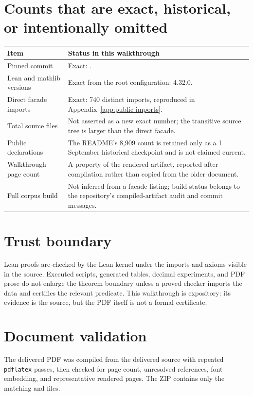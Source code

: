 \documentclass[11pt,oneside]{report}
\theoremstyle{definition}
\theoremstyle{remark}
\DeclareRobustCommand{\lean}[1]{\texorpdfstring{\texttt{\expandafter\seqsplit\expandafter{\detokenize{#1}}}}{\detokenize{#1}}}
\DeclareRobustCommand{\file}[1]{\texorpdfstring{\texttt{\expandafter\seqsplit\expandafter{\detokenize{#1}}}}{\detokenize{#1}}}
\begin{document}
\section{Counts that are exact, historical, or intentionally omitted}
\begin{longtable}{@{}>{\raggedright\arraybackslash}p{} >{\raggedright\arraybackslash}p{}@{}}
\toprule
Item & Status in this walkthrough \\
\midrule
Pinned commit & Exact: \lean{83428e0939114407e02b329621563f835d3e7c20}. \\
Lean and mathlib versions & Exact from the root configuration: 4.32.0. \\
Direct facade imports & Exact: 740 distinct imports, reproduced in Appendix~\ref{app:public-imports}. \\
Total source files & Not asserted as a new exact number; the transitive source tree is larger than the direct facade. \\
Public declarations & The README's 8,909 count is retained only as a 1 September historical checkpoint and is not claimed current. \\
Walkthrough page count & A property of the rendered artifact, reported after compilation rather than copied from the older document. \\
Full corpus build & Not inferred from a facade listing; build status belongs to the repository's compiled-artifact audit and commit messages. \\
\bottomrule
\end{longtable}

\section{Trust boundary}
Lean proofs are checked by the Lean kernel under the imports and axioms visible
in the source.  Executed scripts, generated tables, decimal experiments, and
PDF prose do not enlarge the theorem boundary unless a proved checker imports
the data and certifies the relevant predicate.  This walkthrough is expository:
its evidence is the source, but the PDF itself is not a formal certificate.

\section{Document validation}
The delivered PDF was compiled from the delivered source with repeated
\texttt{pdflatex} passes, then checked for page count, unresolved references,
font embedding, and representative rendered pages.  The ZIP contains only the
matching \file{.tex} and \file{.pdf} files.
\end{document}
